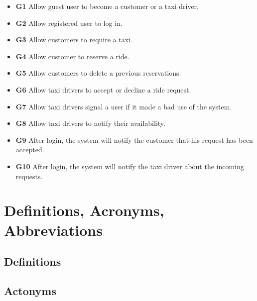 \documentclass{report}
\begin{document}
		\begin{itemize}
			\item \textbf{\lbrack G1\rbrack}\label{sec:g1} Allow guest user to become a customer or a taxi driver.

			\item \textbf{\lbrack G2\rbrack}\label{sec:g2}  Allow registered user to log in.

			\item \textbf{\lbrack G3\rbrack}\label{sec:g3}  Allow customers to require a taxi.

			\item \textbf{\lbrack G4\rbrack}\label{sec:g4}  Allow customer to reserve a ride.

			\item \textbf{\lbrack G5\rbrack}\label{sec:g5}  Allow customers to delete a previous reservations.

			\item \textbf{\lbrack G6\rbrack}\label{sec:g6}  Allow taxi drivers to accept or decline a ride request.

			\item \textbf{\lbrack G7\rbrack}\label{sec:g7} Allow taxi drivers signal a user if it made a bad use of the system.

			\item \textbf{\lbrack G8\rbrack}\label{sec:g8}  Allow taxi drivers to notify their availability.

			\item \textbf{\lbrack G9\rbrack}\label{sec:g9}  After login, the system will notify the customer that his request has been accepted.

			\item \textbf{\lbrack G10\rbrack}\label{sec:g10}  After login, the system will notify the taxi driver about the incoming requests.
		\end{itemize}
		
	\section{Definitions, Acronyms, Abbreviations}
		
		\subsection{Definitions}

		\subsection{Actonyms}
\end{document}
